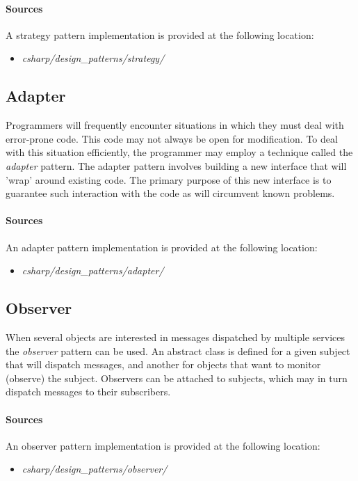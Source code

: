 \documentclass{article}
\begin{document}
\begin{samepage}
  \paragraph{Sources}
  A strategy pattern implementation is provided at the following location:
  \begin{itemize}
  \item{{\em csharp/design\_patterns/strategy/}}
  \end{itemize}
\end{samepage}


\subsection{Adapter}
Programmers will frequently encounter situations in which they must deal with error-prone code. This code may not always be
open for modification. To deal with this situation efficiently, the programmer may employ a technique called the
{\em adapter} pattern. The adapter pattern involves building a new interface that will 'wrap' around existing code.
The primary purpose of this new interface is to guarantee such interaction with the code as will circumvent known problems.

\begin{samepage}
  \paragraph{Sources}
  An adapter pattern implementation is provided at the following location:
  \begin{itemize}
  \item{{\em csharp/design\_patterns/adapter/}}
  \end{itemize}
\end{samepage}


\subsection{Observer}
When several objects are interested in messages dispatched by multiple services the {\em observer} pattern can be used.
An abstract class is defined for a given subject that will dispatch messages, and another for objects that want to monitor
(observe) the subject. Observers can be attached to subjects, which may in turn dispatch messages to their subscribers.

\begin{samepage}
  \paragraph{Sources}
  An observer pattern implementation is provided at the following location:
  \begin{itemize}
  \item{{\em csharp/design\_patterns/observer/}}
  \end{itemize}
\end{samepage}
\end{document}
